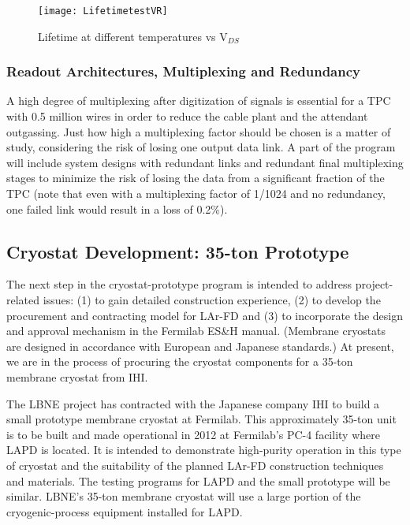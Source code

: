 \begin{figure}
\centering 
{\texttt{[image: LifetimetestVR]}}
\caption{Lifetime at different temperatures vs V$_{DS}$}
\label{DSV}
\end{figure}

\subsubsection{Readout Architectures, Multiplexing and Redundancy}
A high degree of multiplexing after digitization of signals is essential for a TPC with 0.5 million wires in order to reduce the cable plant and the attendant outgassing. Just how high a multiplexing factor should be chosen is a matter of study, considering the risk of losing one output data link. A part of the
program will include system designs with redundant links and redundant final multiplexing stages to minimize the risk of losing the data from a significant fraction of the TPC (note that even with a multiplexing factor of 1/1024 and no redundancy, one failed link would result in a loss of 0.2\%).


\subsection{Cryostat Development: 35-ton Prototype}
\label{35tonprototype}

The next step in the cryostat-prototype program is intended to address project-related issues: (1) to gain detailed construction experience, (2) to develop the procurement and contracting model for LAr-FD and (3) to incorporate the design and approval mechanism in the Fermilab ES\&H manual. (Membrane cryostats are designed in accordance with European and Japanese standards.) At present, we are in the process of procuring the cryostat components for a 35-ton membrane cryostat from IHI.

The LBNE project has contracted with the Japanese company IHI to build a small prototype membrane cryostat at Fermilab.  This approximately 35-ton unit is to be built and made operational in 2012 at Fermilab's PC-4 facility where LAPD is located.  It is intended to demonstrate high-purity operation in this type of cryostat and the suitability of the planned LAr-FD construction techniques and materials.  The testing programs for LAPD and the small prototype will be similar.  LBNE's 35-ton membrane cryostat will use a large portion of the cryogenic-process equipment installed for LAPD.

